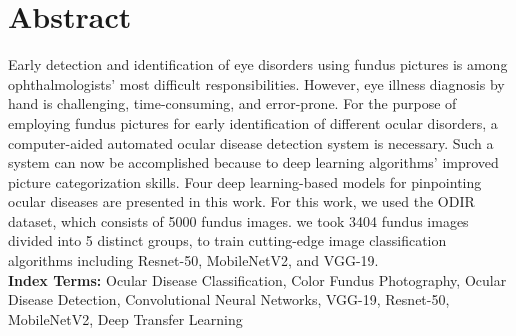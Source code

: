 \chapter*{\centering Abstract}

\pagestyle{fancy}
\fancyhf{}
\fancyhead[LE,RO]{\thepage}


Early detection and identification of eye disorders using fundus pictures is among ophthalmologists’ most difficult responsibilities. However, eye illness diagnosis by hand is challenging, time-consuming, and error-prone. For the purpose of employing fundus pictures for early identification of different ocular disorders, a computer-aided automated ocular disease detection system is necessary. Such a system can now be accomplished because to deep learning algorithms’ improved picture categorization skills. Four deep learning-based models for pinpointing ocular diseases are presented in this work. For this work, we used the ODIR dataset, which consists of 5000 fundus images. we took 3404 fundus images divided into 5 distinct groups, to train cutting-edge image classification algorithms including Resnet-50, MobileNetV2, and VGG-19.\\
\textbf{Index Terms: }Ocular Disease Classification, Color Fundus
Photography, Ocular Disease Detection, Convolutional Neural
Networks, VGG-19, Resnet-50, MobileNetV2, Deep Transfer
Learning
